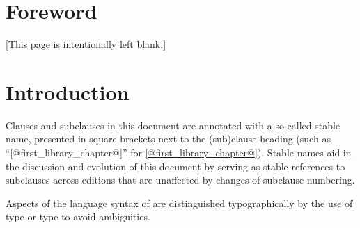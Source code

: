 
\chapter{Foreword}

[This page is intentionally left blank.]

\chapter{Introduction}

Clauses and subclauses in this document are annotated
with a so-called stable name,
presented in square brackets next to the (sub)clause heading
(such as ``[@first_library_chapter@]'' for \ref{@first_library_chapter@}).
Stable names aid in the discussion and evolution of this document
by serving as stable references to subclauses across editions
that are unaffected by changes of subclause numbering.

Aspects of the language syntax of \Cpp{} are distinguished typographically
by the use of  type
or  type to avoid ambiguities.
